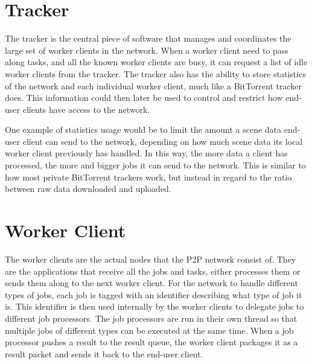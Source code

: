 \section{Tracker}
The tracker is the central piece of software that manages and coordinates the large set of worker clients in the network.
When a worker client need to pass along tasks, and all the known worker clients are busy, it can request a list of idle worker clients from the tracker. The tracker also has the ability to store statistics of the network and each individual worker client, much like a BitTorrent tracker does. This information could then later be used to control and restrict how end-user clients have access to the network. 

One example of statistics usage would be to limit the amount a scene data end-user client can send to the network, depending on how much scene data its local worker client previously has handled. In this way, the more data a client has processed, the more and bigger jobs it can send to the network. This is similar to how most private BitTorrent trackers work, but instead in regard to the ratio between raw data downloaded and uploaded.



\section{Worker Client}
The worker clients are the actual nodes that the P2P network consist of. They are the applications that receive all the jobs and tasks, either processes them or sends them along to the next worker client. For the network to handle different types of jobs, each job is tagged with an identifier describing what type of job it is. This identifier is then used internally by the worker clients to delegate jobs to different job processors. The job processors are run in their own thread so that multiple jobs of different types can be executed at the same time. When a job processor pushes a result to the result queue, the worker client packages it as a result packet and sends it back to the end-user client.

